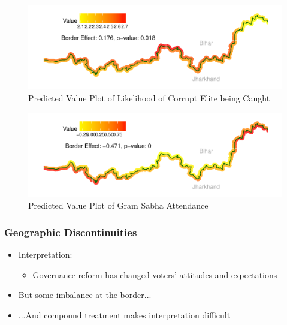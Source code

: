 \documentclass[xcolor=x11names,compress]{beamer}\usepackage[]{graphicx}\usepackage[]{color}
\makeatletter
\def\maxwidth{ %
  \ifdim\Gin@nat@width>\linewidth
    \linewidth
  \else
    \Gin@nat@width
  \fi
}
\renewcommand{\(}{\begin{columns}}
\renewcommand{\)}{\end{columns}}
\newcommand{\<}[1]{\begin{column}{#1}}
\renewcommand{\>}{\end{column}}
\makeatother
\begin{document}
\begin{frame}
\begin{figure}
\includegraphics[width=\maxwidth]{figure/rdd_map_accountability_elite-1} \caption[Predicted Value Plot of Likelihood of Corrupt Elite being Caught]{Predicted Value Plot of Likelihood of Corrupt Elite being Caught}\label{fig:rdd_map_accountability_elite}
\end{figure}
\end{frame}

\begin{frame}
\begin{figure}
\includegraphics[width=\maxwidth]{figure/rdd_map_sabha_att-1} \caption[Predicted Value Plot of Gram Sabha Attendance]{Predicted Value Plot of Gram Sabha Attendance}\label{fig:rdd_map_sabha_att}
\end{figure}
\end{frame}

\begin{frame}
\frametitle{Geographic Discontinuities}
\begin{itemize}
\item Interpretation:
\begin{itemize}
\item Governance reform has changed voters' attitudes and expectations
\end{itemize}
\item But some imbalance at the border...
\pause
\item ...And compound treatment makes interpretation difficult
\end{itemize}
\end{frame}
\end{document}
